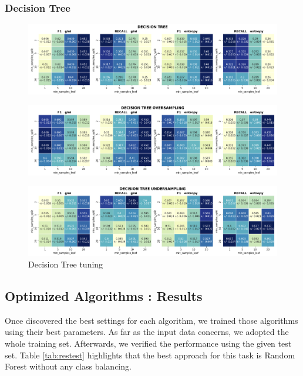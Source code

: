\documentclass{article}
\begin{document}
	
	\subsubsection{Decision Tree}
	\begin{figure}[H]
		\centering
		\includegraphics[width=.9\textwidth]{clf_img/DecisionTree.png}
	\end{figure}
	\begin{figure}[H]
		\centering
		\includegraphics[width=.9\textwidth]{clf_img/DecisionTree_OS.png}
	\end{figure}
	\begin{figure}[H]
		\centering
		\includegraphics[width=.9\textwidth]{clf_img/DecisionTree_US.png}
		\caption{Decision Tree tuning}
		\label{fig:hyper_dectree}
	\end{figure}
	
	
	\subsection{Optimized Algorithms : Results}
	Once discovered the best settings for each algorithm, we trained those algorithms using their best parameters. As far as the input data concerns, we adopted the whole training set. Afterwards, we verified the performance using the given test set. Table \ref{tab:restest} highlights that the best approach for this task is Random Forest without any class balancing. 
	
\end{document}
